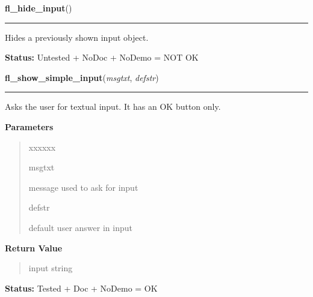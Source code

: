     \vspace{0.5ex}

\hspace{.8\funcindent}\begin{boxedminipage}{\funcwidth}

    \raggedright \textbf{fl\_hide\_input}()

    \vspace{-1.5ex}

    \rule{\textwidth}{0.5\fboxrule}
\setlength{\parskip}{2ex}
    Hides a previously shown input object.

\setlength{\parskip}{1ex}
\textbf{Status:} Untested + NoDoc + NoDemo = NOT OK



    \end{boxedminipage}

    \label{xformslib:flgoodies:fl_show_simple_input}

    \vspace{0.5ex}

\hspace{.8\funcindent}\begin{boxedminipage}{\funcwidth}

    \raggedright \textbf{fl\_show\_simple\_input}(\textit{msgtxt}, \textit{defstr})

    \vspace{-1.5ex}

    \rule{\textwidth}{0.5\fboxrule}
\setlength{\parskip}{2ex}
    Asks the user for textual input. It has an OK button only.

\setlength{\parskip}{1ex}
      \textbf{Parameters}
      \vspace{-1ex}

      \begin{quote}
        \begin{Ventry}{xxxxxx}

          \item[msgtxt]

          message used to ask for input

          \item[defstr]

          default user answer in input

        \end{Ventry}

      \end{quote}

      \textbf{Return Value}
    \vspace{-1ex}

      \begin{quote}
      input string

      \end{quote}

\textbf{Status:} Tested + Doc + NoDemo = OK



    \end{boxedminipage}


